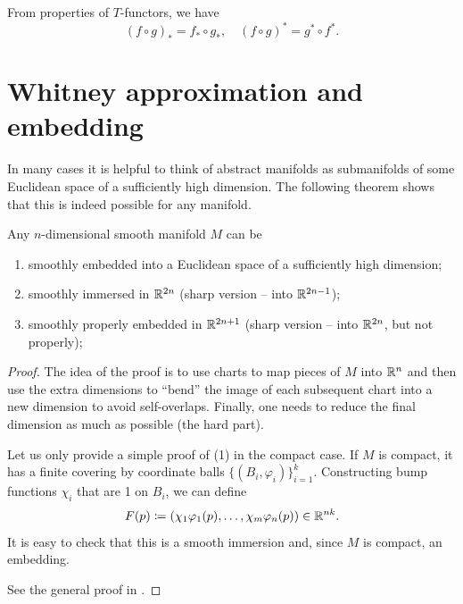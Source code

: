 \begin{rem}
    From properties of $T$-functors, we have 
    \[
    (f\circ g)_\ast=f_\ast\circ g_\ast,\quad (f\circ g)^\ast=g^\ast\circ f^\ast.
    \]
\end{rem}

\section{Whitney approximation and embedding}

In many cases it is helpful to think of abstract manifolds as submanifolds of some Euclidean space of a sufficiently high dimension. The following theorem shows that this is indeed possible for any manifold.

\begin{thm}\label{thm whitney embedding}
    Any $n$-dimensional smooth manifold $M$ can be
    \begin{enumerate}
        \item smoothly embedded into a Euclidean space of a sufficiently high dimension;
        \item smoothly immersed in $\mathbb{R}^{2n}$ (sharp version -- into $\mathbb{R}^{2n-1}$);
        \item smoothly properly embedded in $\mathbb{R}^{2n+1}$ (sharp version -- into $\mathbb{R}^{2n}$, but not properly);
    \end{enumerate}
    \end{thm}
\begin{proof}
    The idea of the proof is to use charts to map pieces of $M$ into $\mathbb{R}^n$ and then use the extra dimensions to ``bend'' the image of each subsequent chart into a new dimension to avoid self-overlaps. Finally, one needs to reduce the final dimension as much as possible (the hard part).

    Let us only provide a simple proof of (1) in the compact case. If $M$ is compact, it has a finite covering by coordinate balls $\{(B_i,\varphi_i)\}_{i=1}^k$. Constructing bump functions $\chi_i$ that are 1 on $B_i$, we can define
    \[
        F(p)\coloneqq (\chi_1\varphi_1(p),\ldots, \chi_m\varphi_n(p))\in\mathbb{R}^{nk}.
    \]
    It is easy to check that this is a smooth immersion and, since $M$ is compact, an embedding.

    See the general proof in \cite[Thm. 6.15]{Lee}.
\end{proof}

